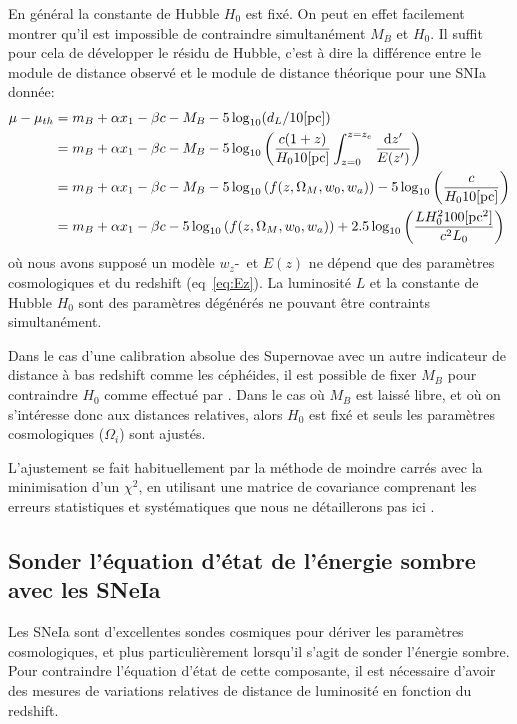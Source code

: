 \documentclass[../main/main.tex]{subfiles}
\begin{document}
En général la constante de Hubble $H_{0}$ est fixé. On peut en effet
facilement montrer qu'il est impossible de contraindre simultanément
$M_{B}$ et $H_{0}$. Il suffit pour cela de développer le résidu de
Hubble, c'est à dire la différence entre le module de distance observé et le
module de distance théorique pour une SNIa donnée:
\begin{align}
  \mu - \mu_{th}&= m_{B}+\alpha x_{1}-\beta c -M_{B}
  -5\log_{10}(d_{L}/10[\text{pc}])\\
  &=m_{B}+\alpha x_{1}-\beta c - M_{B} -
    5\log_{10}\left(\frac{c(1+z)}{H_{0}10[\text{pc}]}\int_{z=0}^{z=z_{e}}\frac{\mathrm{d} z'}{E(z')}\right) \\
  &= m_{B}+\alpha x_{1}-\beta c - M_{B} -
    5\log_{10}\left(f(z,\Omega_{M},w_{0},w_{a})\right) -
    5\log_{10}\left(\frac{c}{H_{0}10[\text{pc}]}\right)\\
  &= m_{B}+\alpha x_{1}-\beta c -
    5\log_{10}\left(f(z,\Omega_{M},w_{0},w_{a})\right)
    +2.5\log_{10}\left(\frac{LH_{0}^{2}100[\text{pc}^{2}]}{c^{2}L_{0}}\right)
\end{align}
où nous avons supposé un modèle $w_{z}$-\lcdm\ et $E(z)$ ne dépend que des
paramètres cosmologiques et du redshift (eq~\ref{eq:Ez}). La luminosité
$L$ et la constante de Hubble $H_{0}$ sont des paramètres dégénérés ne
pouvant être contraints simultanément.

Dans le cas d'une calibration absolue des Supernovae avec un autre
indicateur de distance à bas redshift comme les céphéides, il est possible de fixer
$M_{B}$ pour contraindre $H_0$ comme effectué par \citet{Riess2016}. Dans le cas où $M_{B}$ est laissé libre, et où on
s'intéresse donc aux distances relatives, alors $H_{0}$ est fixé et seuls les paramètres
cosmologiques ($\Omega_i$) sont ajustés.

L'ajustement se fait habituellement par la méthode de moindre carrés
avec la minimisation d'un $\chi^{2}$, en utilisant une matrice de
covariance comprenant les erreurs statistiques et systématiques que nous
ne détaillerons pas ici \citep[voir][]{Betoule2014}.

\subsection{Sonder l'équation d'état de l'énergie sombre avec les SNeIa}

Les SNeIa sont d'excellentes sondes cosmiques pour dériver les
paramètres cosmologiques, et plus particulièrement lorsqu'il s'agit de
sonder l'énergie sombre. Pour contraindre l'équation d'état de cette
composante, il est nécessaire d'avoir des mesures de variations
relatives de distance de luminosité en fonction du redshift.
\end{document}
